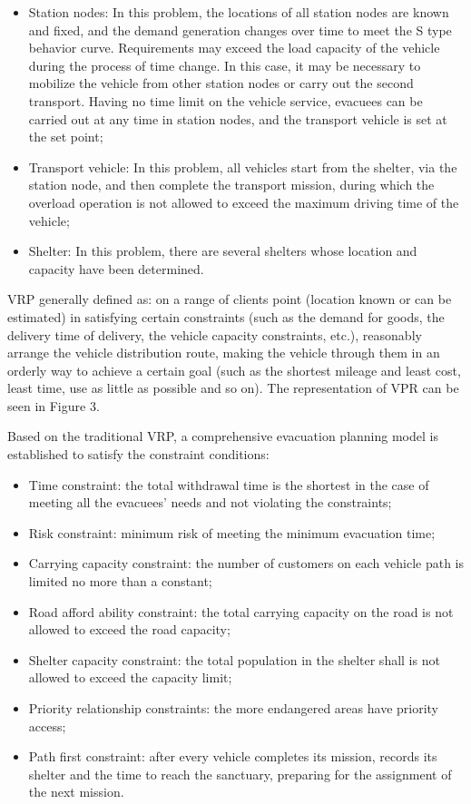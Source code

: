 \documentclass{mcmthesis}
\begin{document}
\begin{itemize}

\item Station nodes: In this problem, the locations of all station nodes are known and fixed, and the demand generation changes over time to meet the S type behavior curve. Requirements may exceed the load capacity of the vehicle during the process of time change. In this case, it may be necessary to mobilize the vehicle from other station nodes or carry out the second transport. Having no time limit on the vehicle service, evacuees can be carried out at any time in station nodes, and the transport vehicle is set at the set point;
\item Transport vehicle: In this problem, all vehicles start from the shelter, via the station node, and then complete the transport mission, during which the overload operation is not allowed to exceed the maximum driving time of the vehicle;

\item Shelter: In this problem, there are several shelters whose location and capacity have been determined.
\end{itemize}

VRP \cite{Dikas2016Solving,He2015Model} generally defined as: on a range of clients point (location known or can be estimated) in satisfying certain constraints (such as the demand for goods, the delivery time of delivery, the vehicle capacity constraints, etc.), reasonably arrange the vehicle distribution route, making the vehicle through them in an orderly way to achieve a certain goal (such as the shortest mileage and least cost, least time, use as little as possible and so on). The representation of VPR can be seen in Figure 3.


Based on the traditional VRP, a comprehensive evacuation planning model is established to satisfy the constraint conditions:
\begin{itemize}
  \item Time constraint: the total withdrawal time is the shortest in the case of meeting all the evacuees' needs and not violating the constraints;
  \item Risk constraint: minimum risk of meeting the minimum evacuation time;
  \item Carrying capacity constraint: the number of customers on each vehicle path is limited no more than a constant;
  \item Road afford ability constraint: the total carrying capacity on the road is not allowed to exceed the road capacity;
  \item Shelter capacity constraint: the total population in the shelter shall is not allowed to exceed the capacity limit;
  \item Priority relationship constraints: the more endangered areas have priority access;
  \item Path first constraint: after every vehicle completes its mission, records its shelter and the time to reach the sanctuary, preparing for the assignment of the next mission.
\end{itemize}
\end{document}
